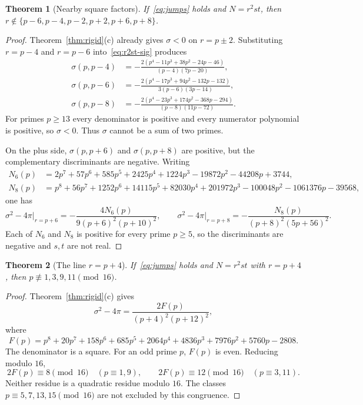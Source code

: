 \documentclass[11pt,reqno]{amsart}
\newtheorem{theorem}{Theorem}
\theoremstyle{definition}
\begin{document}
\begin{theorem}[Nearby square factors]
\label{thm:r2st-off}
If~\eqref{eq:jumps} holds and \(N=r^2st\), then \(r\notin\{p-6,p-4,p-2,p+2,p+6,p+8\}\).
\end{theorem}

\begin{proof}
Theorem~\ref{thm:rigid}(c) already gives \(\sigma<0\) on \(r=p\pm 2\). Substituting \(r=p-4\) and \(r=p-6\) into~\eqref{eq:r2st-sig} produces
\begin{align*}
\sigma(p,p-4)&=-\frac{2(p^4-11p^3+38p^2-24p-46)}{(p-4)(7p-20)},\\
\sigma(p,p-6)&=-\frac{2(p^4-17p^3+94p^2-132p-132)}{3(p-6)(3p-14)},\\
\sigma(p,p-8)&=-\frac{2(p^4-23p^3+174p^2-368p-294)}{(p-8)(11p-72)}.
\end{align*}
For primes \(p\ge 13\) every denominator is positive and every numerator polynomial is positive, so \(\sigma<0\). Thus \(\sigma\) cannot be a sum of two primes.

On the plus side, \(\sigma(p,p+6)\) and \(\sigma(p,p+8)\) are positive, but the complementary discriminants are negative. Writing
\begin{align*}
N_6(p)&=2p^7+57p^6+585p^5+2425p^4+1224p^3-19872p^2-44208p+3744,\\
N_8(p)&=p^8+56p^7+1252p^6+14115p^5+82030p^4+201972p^3-100048p^2-1061376p-39568,
\end{align*}
one has
\[
\sigma^2-4\pi\big|_{r=p+6}=-\frac{4N_6(p)}{9(p+6)^2(p+10)^2},\qquad
\sigma^2-4\pi\big|_{r=p+8}=-\frac{N_8(p)}{(p+8)^2(5p+56)^2}.
\]
Each of \(N_6\) and \(N_8\) is positive for every prime \(p\ge 5\), so the discriminants are negative and \(s,t\) are not real.
\end{proof}

\begin{theorem}[The line \(r=p+4\)]
\label{thm:rp4}
If~\eqref{eq:jumps} holds and \(N=r^2st\) with \(r=p+4\), then \(p\not\equiv 1,3,9,11\pmod{16}\).
\end{theorem}

\begin{proof}
Theorem~\ref{thm:rigid}(c) gives
\[
\sigma^2-4\pi=\frac{2F(p)}{(p+4)^2(p+12)^2},
\]
where
\[
F(p)=p^8+20p^7+158p^6+685p^5+2064p^4+4836p^3+7976p^2+5760p-2808.
\]
The denominator is a square. For an odd prime \(p\), \(F(p)\) is even. Reducing modulo \(16\),
\[
2F(p)\equiv 8\pmod{16}\quad(p\equiv 1,9),\qquad
2F(p)\equiv 12\pmod{16}\quad(p\equiv 3,11).
\]
Neither residue is a quadratic residue modulo \(16\). The classes \(p\equiv 5,7,13,15\pmod{16}\) are not excluded by this congruence.
\end{proof}
\end{document}
